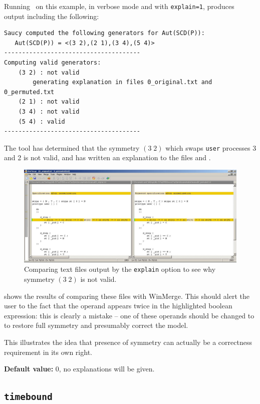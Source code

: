 Running \topspin\ on this example, in verbose mode and with \texttt{explain=1}, produces output including the following:

\begin{lstlisting}
Saucy computed the following generators for Aut(SCD(P)):
   Aut(SCD(P)) = <(3 2),(2 1),(3 4),(5 4)>
--------------------------------------
Computing valid generators:
    (3 2) : not valid
        generating explanation in files 0_original.txt and 0_permuted.txt
    (2 1) : not valid
    (3 4) : not valid
    (5 4) : valid
--------------------------------------
\end{lstlisting}

The tool has determined that the symmetry $(3\;2)$ which swaps \texttt{user} processes 3 and 2 is not valid, and has written an explanation to the files
 and .

\begin{figure}
\center
\includegraphics[scale=0.46]{explain.jpg}\caption{Comparing text files output by the \texttt{explain} option to see why symmetry $(3\;2)$ is not valid.}\label{fig:explain}
\end{figure}


 shows the results of comparing these files with WinMerge.  This should alert the user to the fact that the operand  appears
twice in the highlighted boolean expression: this is clearly a mistake -- one of these operands should be changed to  to restore full
symmetry and presumably correct the model.

This illustrates the idea that presence of symmetry can actually be a correctness requirement in its own right.

\noindent\textbf{Default value: } 0, \ie no explanations will be given.

\subsection{\texttt{timebound}}

